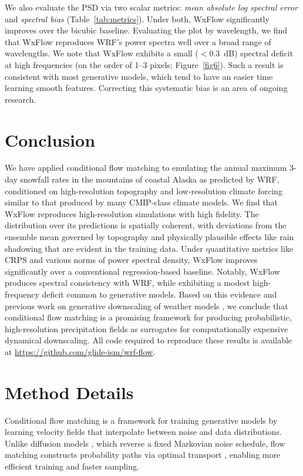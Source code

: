 \documentclass[11pt]{article}
\begin{document}
We also evaluate the PSD via two scalar metrics: \emph{mean absolute log spectral error} and \emph{spectral bias} (Table~\ref{tab:metrics}).  Under both, WxFlow significantly improves over the bicubic baseline.  Evaluating the plot by wavelength, we find that WxFlow reproduces WRF's power spectra well over a broad range of wavelengths.  We note that WxFlow exhibits a small ($<$0.3~dB) spectral deficit at high frequencies (on the order of 1--3 pixels; Figure~\ref{fig6}).  Such a result is consistent with most generative models, which tend to have an easier time learning smooth features.  Correcting this systematic bias is an area of ongoing research.


\section{Conclusion}
We have applied conditional flow matching to emulating the annual maximum 3-day snowfall rates in the mountains of coastal Alaska as predicted by WRF, conditioned on high-resolution topography and low-resolution climate forcing similar to that produced by many CMIP-class climate models. We find that WxFlow reproduces high-resolution simulations with high fidelity. The distribution over its predictions is spatially coherent, with deviations from the ensemble mean governed by topography and physically plausible effects like rain shadowing that are evident in the training data. Under quantitative metrics like CRPS and various norms of power spectral density, WxFlow improves significantly over a conventional regression-based baseline. Notably, WxFlow produces spectral consistency with WRF, while exhibiting a modest high-frequency deficit common to generative models. Based on this evidence and previous work on generative downscaling of weather models \citep{mardani2025,pathak2024}, we conclude that conditional flow matching is a promising framework for producing probabilistic, high-resolution precipitation fields as surrogates for computationally expensive dynamical downscaling.  All code required to reproduce these results is available at \url{https://github.com/glide-ism/wrf-flow}.

\appendix
\section{Method Details}
\label{Sec:appendix}

Conditional flow matching \citep{lipman2023} is a framework for training generative models by learning velocity fields that interpolate between noise and data distributions. Unlike diffusion models \citep{ho2020}, which reverse a fixed Markovian noise schedule, flow matching constructs probability paths via optimal transport \citep{chen2018}, enabling more efficient training and faster sampling.
\end{document}
